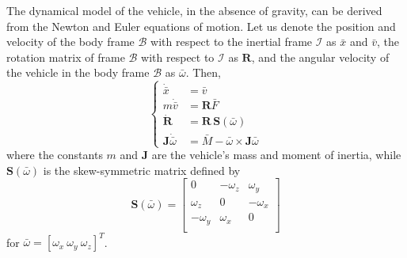 \documentclass[review]{elsarticle}
\begin{document}
The dynamical model of the vehicle, in the absence of gravity, can be
derived from the Newton and Euler equations of motion. Let us denote the position and velocity of the
body frame $\mathcal{B}$ with respect to the inertial frame
$\mathcal{I}$ as $\bar{x}$ and $\bar{v}$, the rotation matrix of frame
$\mathcal{B}$ with respect to $\mathcal{I}$ as $\mathbf{R}$, and the
angular velocity of the vehicle in the body frame $\mathcal{B}$ as
$\bar{\omega}$. Then,
\begin{equation}
  \label{eq:dynsys}
  \left\{
    \begin{aligned}
      \dot{\bar{x}} &= \bar{v} \\
      m \dot{\bar{v}} &= \mathbf{R} \bar{F} \\
      \dot{\mathbf{R}} &= \mathbf{R}\,\mathbf{S}(\bar{\omega}) \\
      \mathbf{J} \dot{\bar{\omega}} &= \bar{M} - \bar{\omega}\times\mathbf{J} \bar{\omega}
    \end{aligned}
  \right.
\end{equation}
where the constants $m$ and $\mathbf{J}$
are the vehicle's mass and moment of inertia, while
$\mathbf{S}(\bar{\omega})$ is the skew-symmetric matrix defined by
\begin{equation}
  \label{eq:S}
  \mathbf{S}(\bar{\omega}) =
  \left[
    \begin{array}{ccc}
      0 & -\omega_z & \omega_y \\
      \omega_z & 0 & -\omega_x \\
      -\omega_y & \omega_x & 0 \\
    \end{array}
  \right]
\end{equation}
for $\bar{\omega}=[\omega_x\:\omega_y\:\omega_z]^T$.
\end{document}
